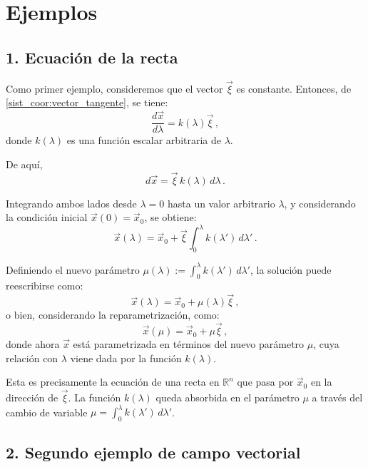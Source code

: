 \documentclass[../apunte_mecanica_clasica.tex]{subfiles}%
\begin{document}
\clearpage

\section{Ejemplos}

\subsection*{1. Ecuación de la recta}

Como primer ejemplo, consideremos que el vector $\vec{\xi}$ es constante. Entonces, de \eqref{sist_coor:vector_tangente}, se tiene:
\begin{equation*}
\frac{d\vec{x}}{d\lambda} = k(\lambda)\vec{\xi} \,,
\end{equation*}
donde $k(\lambda)$ es una función escalar arbitraria de $\lambda$.

De aquí,
\begin{equation*}
d\vec{x} = \vec{\xi} \, k(\lambda)\, d\lambda\,.
\end{equation*}

Integrando ambos lados desde $\lambda = 0$ hasta un valor arbitrario $\lambda$, y considerando la condición inicial $\vec{x}(0) = \vec{x}_0$, se obtiene:
\begin{equation*}
\vec{x}(\lambda) = \vec{x}_0 + \vec{\xi} \int_0^\lambda k(\lambda')\, d\lambda'\,.
\end{equation*}

Definiendo el nuevo parámetro $\mu(\lambda) := \int_0^\lambda k(\lambda')\, d\lambda'$, la solución puede reescribirse como:
\begin{equation*}
\vec{x}(\lambda) = \vec{x}_0 + \mu(\lambda) \vec{\xi}\,,
\end{equation*}
o bien, considerando la reparametrización, como:
\begin{equation*}
\vec{x}(\mu) = \vec{x}_0 + \mu \vec{\xi}\,,
\end{equation*}
donde ahora $\vec{x}$ está parametrizada en términos del nuevo parámetro $\mu$, cuya relación con $\lambda$ viene dada por la función $k(\lambda)$.

Esta es precisamente la ecuación de una recta en $\mathbb{R}^n$ que pasa por $\vec{x}_0$ en la dirección de $\vec{\xi}$. La función $k(\lambda)$ queda absorbida en el parámetro $\mu$ a través del cambio de variable $\mu = \int_0^\lambda k(\lambda')\, d\lambda'$.

\subsection*{2. Segundo ejemplo de campo vectorial}
\end{document}

